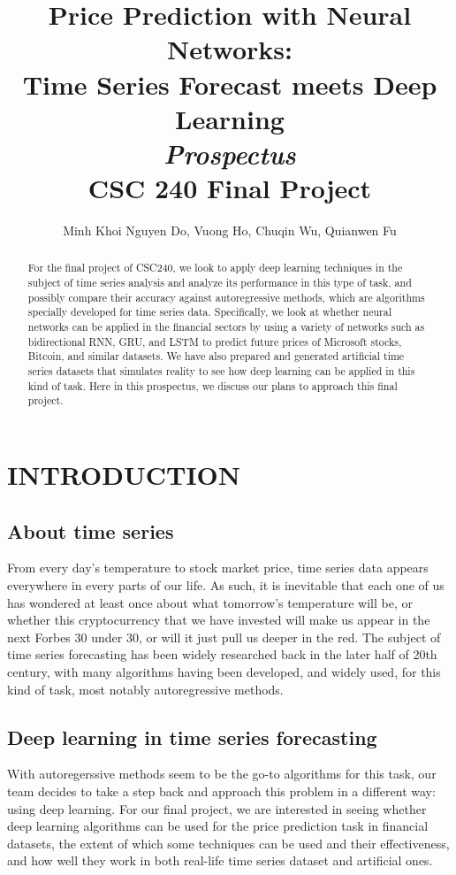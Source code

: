 \documentclass[letterpaper, 10 pt, conference]{ieeeconf}  %
\title{\LARGE
\textbf{Price Prediction with Neural Networks:\\ Time Series Forecast meets Deep Learning}\\
\Large
\textit{Prospectus}\\
\Large
CSC 240 Final Project
}
\author{Minh Khoi Nguyen Do, Vuong Ho, Chuqin Wu, Quianwen Fu}
\begin{document}
\maketitle
\thispagestyle{empty}
\pagestyle{empty}


\begin{abstract}
For the final project of CSC240, we look to apply deep learning techniques in the subject of time series analysis and analyze its performance in this type of task, and possibly compare their accuracy against autoregressive methods, which are algorithms specially developed for time series data. Specifically, we look at whether neural networks can be applied in the financial sectors by using a variety of networks such as bidirectional RNN, GRU, and LSTM to predict future prices of Microsoft stocks, Bitcoin, and similar datasets. We have also prepared and generated artificial time series datasets that simulates reality to see how deep learning can be applied in this kind of task. Here in this prospectus, we discuss our plans to approach this final project.

\end{abstract}


\section{INTRODUCTION}
\subsection{About time series}
    From every day's temperature to stock market price, time series data appears everywhere in every parts of our life. As such, it is inevitable that each one of us has wondered at least once about what tomorrow's temperature will be, or whether this cryptocurrency that we have invested will make us appear in the next Forbes 30 under 30, or will it just pull us deeper in the red. The subject of time series forecasting has been widely researched back in the later half of 20th century, with many algorithms having been developed, and widely used, for this kind of task, most notably autoregressive methods.

\subsection{Deep learning in time series forecasting}
    With autoregerssive methods seem to be the go-to algorithms for this task, our team decides to take a step back and approach this problem in a different way: using deep learning. For our final project, we are interested in seeing whether deep learning algorithms can be used for the price prediction task in financial datasets, the extent of which some techniques can be used and their effectiveness, and how well they work in both real-life time series dataset and artificial ones.
\end{document}
